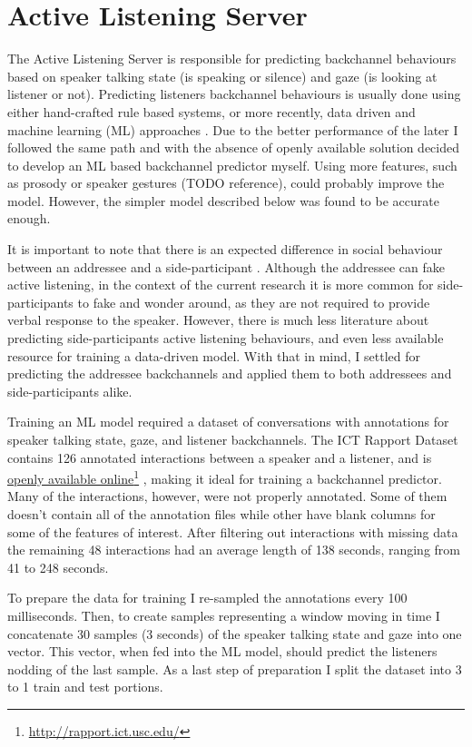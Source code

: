\documentclass[]{simple-thesis}
\newcommand\fnurl[2]{%
  \href{#2}{#1}\footnote{\url{#2}}%
}
\begin{document}
\section{Active Listening Server}\label{system:active_listening_server}

The Active Listening Server is responsible for predicting backchannel behaviours based on speaker talking state (is speaking or silence) and gaze (is looking at listener or not).
Predicting listeners backchannel behaviours is usually done using either hand-crafted rule based systems, or more recently, data driven and machine learning (ML) approaches \citep{Morency2008}.
Due to the better performance of the later I followed the same path and with the absence of openly available solution decided to develop an ML based backchannel predictor myself.
Using more features, such as prosody \citep{Ward2000} or speaker gestures (TODO reference), could probably improve the model.
However, the simpler model described below was found to be accurate enough.

It is important to note that there is an expected difference in social behaviour between an addressee and a side-participant \citep{Clark1982}.
Although the addressee can fake active listening, in the context of the current research it is more common for side-participants to fake and wonder around, as they are not required to provide verbal response to the speaker.
However, there is much less literature about predicting side-participants active listening behaviours, and even less available resource for training a data-driven model.
With that in mind, I settled for predicting the addressee backchannels and applied them to both addressees and side-participants alike.

Training an ML model required a dataset of conversations with annotations for speaker talking state, gaze, and listener backchannels.
The ICT Rapport Dataset \citep{Gratch2007} contains 126 annotated interactions between a speaker and a listener, and is \fnurl{openly available online}{http://rapport.ict.usc.edu/}, making it ideal for training a backchannel predictor.
Many of the interactions, however, were not properly annotated.
Some of them doesn't contain all of the annotation files while other have blank columns for some of the features of interest.
After filtering out interactions with missing data the remaining 48 interactions had an average length of 138 seconds, ranging from 41 to 248 seconds.

To prepare the data for training I re-sampled the annotations every 100 milliseconds.
Then, to create samples representing a window moving in time I concatenate 30 samples (3 seconds) of the speaker talking state and gaze into one vector.
This vector, when fed into the ML model, should predict the listeners nodding of the last sample.
As a last step of preparation I split the dataset into 3 to 1 train and test portions.
\end{document}
